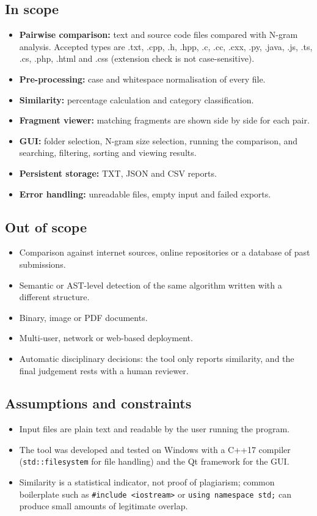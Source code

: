 \documentclass[12pt,a4paper,oneside]{book}
\begin{document}
\subsection{In scope}
\begin{itemize}
  \item \textbf{Pairwise comparison:} text and source code files compared with N-gram analysis. Accepted types are .txt, .cpp, .h, .hpp, .c, .cc, .cxx, .py, .java, .js, .ts, .cs, .php, .html and .css (extension check is not case-sensitive).
  \item \textbf{Pre-processing:} case and whitespace normalisation of every file.
  \item \textbf{Similarity:} percentage calculation and category classification.
  \item \textbf{Fragment viewer:} matching fragments are shown side by side for each pair.
  \item \textbf{GUI:} folder selection, N-gram size selection, running the comparison, and searching, filtering, sorting and viewing results.
  \item \textbf{Persistent storage:} TXT, JSON and CSV reports.
  \item \textbf{Error handling:} unreadable files, empty input and failed exports.
\end{itemize}

\subsection{Out of scope}
\begin{itemize}
  \item Comparison against internet sources, online repositories or a database of past submissions.
  \item Semantic or AST-level detection of the same algorithm written with a different structure.
  \item Binary, image or PDF documents.
  \item Multi-user, network or web-based deployment.
  \item Automatic disciplinary decisions: the tool only reports similarity, and the final judgement rests with a human reviewer.
\end{itemize}

\subsection{Assumptions and constraints}
\begin{itemize}
  \item Input files are plain text and readable by the user running the program.
  \item The tool was developed and tested on Windows with a C++17 compiler (\texttt{std::filesystem} for file handling) and the Qt framework for the GUI.
  \item Similarity is a statistical indicator, not proof of plagiarism; common boilerplate such as \texttt{\#include <iostream>} or \texttt{using namespace std;} can produce small amounts of legitimate overlap.
\end{itemize}
\end{document}

